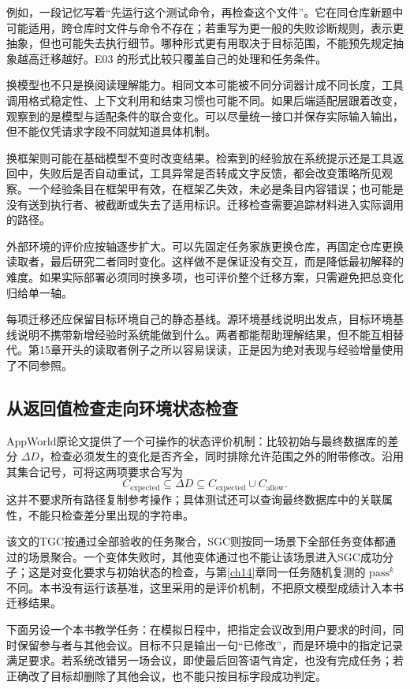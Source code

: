 例如，一段记忆写着“先运行这个测试命令，再检查这个文件”。它在同仓库新题中可能适用，跨仓库时文件与命令不存在；若重写为更一般的失败诊断规则，表示更抽象，但也可能失去执行细节。哪种形式更有用取决于目标范围，不能预先规定抽象越高迁移越好。E03 的形式比较只覆盖自己的处理和任务条件。

换模型也不只是换阅读理解能力。相同文本可能被不同分词器计成不同长度，工具调用格式稳定性、上下文利用和结束习惯也可能不同。如果后端适配层跟着改变，观察到的是模型与适配条件的联合变化。可以尽量统一接口并保存实际输入输出，但不能仅凭请求字段不同就知道具体机制。

换框架则可能在基础模型不变时改变结果。检索到的经验放在系统提示还是工具返回中，失败后是否自动重试，工具异常是否转成文字反馈，都会改变策略所见观察。一个经验条目在框架甲有效，在框架乙失效，未必是条目内容错误；也可能是没有送到执行者、被截断或失去了适用标识。迁移检查需要追踪材料进入实际调用的路径。

外部环境的评价应按轴逐步扩大。可以先固定任务家族更换仓库，再固定仓库更换读取者，最后研究二者同时变化。这样做不是保证没有交互，而是降低最初解释的难度。如果实际部署必须同时换多项，也可评价整个迁移方案，只需避免把总变化归给单一轴。

每项迁移还应保留目标环境自己的静态基线。源环境基线说明出发点，目标环境基线说明不携带新增经验时系统能做到什么。两者都能帮助理解结果，但不能互相替代。第15章开头的读取者例子之所以容易误读，正是因为绝对表现与经验增量使用了不同参照。

\subsection{从返回值检查走向环境状态检查}
\label{sec:ch15-stateevaluation}

AppWorld原论文提供了一个可操作的状态评价机制：比较初始与最终数据库的差分 $\Delta D$，检查必须发生的变化是否齐全，同时排除允许范围之外的附带修改\cite{appworld-2407}。沿用其集合记号，可将这两项要求合写为
\[
 C_{\mathrm{expected}}\subseteq\Delta D\subseteq C_{\mathrm{expected}}\cup C_{\mathrm{allow}}.
\]
这并不要求所有路径复制参考操作；具体测试还可以查询最终数据库中的关联属性，不能只检查差分里出现的字符串。

该文的TGC按通过全部验收的任务聚合，SGC则按同一场景下全部任务变体都通过的场景聚合。一个变体失败时，其他变体通过也不能让该场景进入SGC成功分子；这是对变化要求与初始状态的检查，与第\ref{ch14}章同一任务随机复测的 $\mathrm{pass}^{k}$ 不同。本书没有运行该基准，这里采用的是评价机制，不把原文模型成绩计入本书迁移结果。

下面另设一个本书教学任务：在模拟日程中，把指定会议改到用户要求的时间，同时保留参与者与其他会议。目标不只是输出一句“已修改”，而是环境中的指定记录满足要求。若系统改错另一场会议，即使最后回答语气肯定，也没有完成任务；若正确改了目标却删除了其他会议，也不能只按目标字段成功判定。

